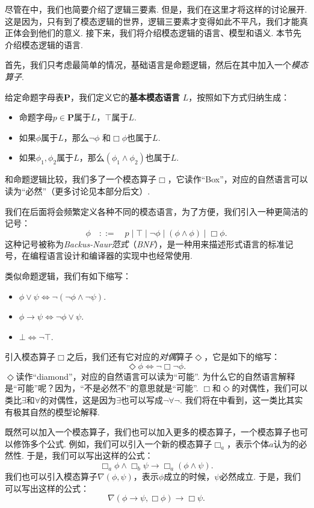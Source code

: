 尽管在中，我们也简要介绍了逻辑三要素. 但是，我们在这里才将这样的讨论展开. 这是因为，只有到了模态逻辑的世界，逻辑三要素才变得如此不平凡，我们才能真正体会到他们的意义. 接下来，我们将介绍模态逻辑的语言、模型和语义. 本节先介绍模态逻辑的语言. 

首先，我们只考虑最简单的情况，基础语言是命题逻辑，然后在其中加入一个\textit{模态算子}. 

\begin{definition}[基本模态语言]
给定命题字母表$\mathbf P$，我们定义它的\textbf{基本模态语言} $L$，按照如下方式归纳生成：
\begin{itemize}
    \item 命题字母$p\in \mathbf P$属于$L$，$\top$属于$L$. 
    \item 如果$\phi$属于$L$，那么$\neg\phi$ 和$\Box\phi$也属于$L$. 
    \item 如果$\phi_1,\phi_2$属于$L$，那么$(\phi_1\wedge\phi_2)$也属于$L$. 
\end{itemize}
\end{definition}

和命题逻辑比较，我们多了一个模态算子$\Box$，它读作“Box”，对应的自然语言可以读为“必然”（更多讨论见本部分后文）. 

我们在后面将会频繁定义各种不同的模态语言，为了方便，我们引入一种更简洁的记号：
\[\phi\quad::=\quad p\mid \top\mid \neg\phi\mid (\phi\wedge\phi)\mid \Box\phi.\]
这种记号被称为\textit{Backus-Naur范式}（\textit{BNF}），是一种用来描述形式语言的标准记号，在编程语言设计和编译器的实现中也经常使用. 

类似命题逻辑，我们有如下缩写：
\begin{itemize}
    \item $\phi\vee\psi\iff\neg(\neg \phi\wedge\neg\psi)$.
    \item $\phi\to\psi\iff\neg\phi\vee\psi$.
    \item $\bot\iff\neg\top$.
\end{itemize}

引入模态算子$\Box$之后，我们还有它对应的\textit{对偶}算子$\Diamond$，它是如下的缩写：
\[\Diamond\phi\iff\neg\Box\neg\phi.\]
$\Diamond$读作“diamond”，对应的自然语言可以读为“可能”. 为什么它的自然语言解释是“可能”呢？因为，“不是必然不”的意思就是“可能”. $\Box$和$\Diamond$的对偶性，我们可以类比$\exists$和$\forall$的对偶性，这是因为$\exists$也可以写成$\neg\forall\neg$. 我们将在中看到，这一类比其实有极其自然的模型论解释. 

既然可以加入一个模态算子，我们也可以加入更多的模态算子，一个模态算子也可以修饰多个公式. 例如，我们可以引入一个新的模态算子$\Box_a$，表示个体$a$认为的必然性. 于是，我们可以写出这样的公式：
\[\Box_a\phi\wedge\Box_b\psi\to\Box_a(\phi\wedge\psi).\]
我们也可以引入模态算子$\nabla(\phi,\psi)$，表示$\phi$成立的时候，$\psi$必然成立. 于是，我们可以写出这样的公式：
\[\nabla(\phi\to\psi,\Box\phi)\to\Box\psi.\]

